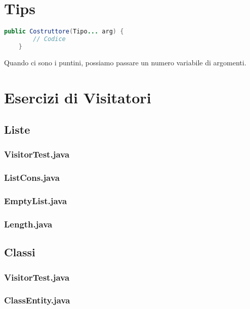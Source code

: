 \documentclass[10pt]{article}
\begin{document}
\section{Tips}
\begin{lstlisting}[language=Java]
    public Costruttore(Tipo... arg) {
        // Codice
    }
\end{lstlisting}
Quando ci sono i puntini, possiamo passare un numero variabile di argomenti.

\section{Esercizi di Visitatori}
        \subsection{Liste}
        \subsubsection{VisitorTest.java}
            
        \subsubsection{ListCons.java}
            
        \subsubsection{EmptyList.java}
            
        \subsubsection{Length.java}
            
        
        \subsection{Classi}
        \subsubsection{VisitorTest.java}
            
        \subsubsection{ClassEntity.java}
            
\end{document}
